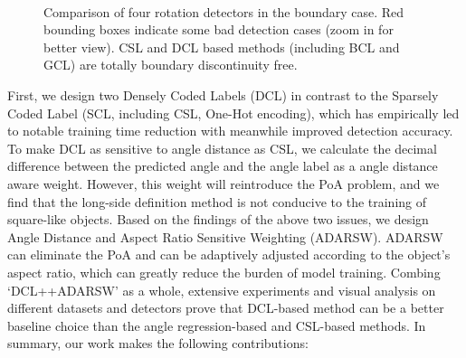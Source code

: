 \documentclass[final]{cvpr}
\begin{document}
\begin{figure}[!tb]
		\centering
		\\
		\centering
		\caption{Comparison of four rotation detectors in the boundary case. Red bounding boxes indicate some bad detection cases (zoom in for better view). CSL and DCL based methods (including BCL and GCL) are totally boundary discontinuity free.}
		\label{fig:bc_vis}
		\vspace{-8pt}
\end{figure}



First, we design two Densely Coded Labels (DCL) in contrast to the Sparsely Coded Label (SCL, including CSL, One-Hot encoding), which has empirically led to notable training time reduction with meanwhile improved detection accuracy. To make DCL as sensitive to angle distance as CSL, we calculate the decimal difference between the predicted angle and the angle label as a angle distance aware weight. However, this weight will reintroduce the PoA problem, and we find that the long-side definition method is not conducive to the training of square-like objects. Based on the findings of the above two issues, we design Angle Distance and Aspect Ratio Sensitive Weighting (ADARSW). ADARSW can eliminate the PoA and can be adaptively adjusted according to the object's aspect ratio, which can greatly reduce the burden of model training. Combing `DCL++ADARSW' as a whole, extensive experiments and visual analysis on different datasets and detectors prove that DCL-based method can be a better baseline choice than the angle regression-based and CSL-based methods. In summary, our work makes the following contributions:
\end{document}
